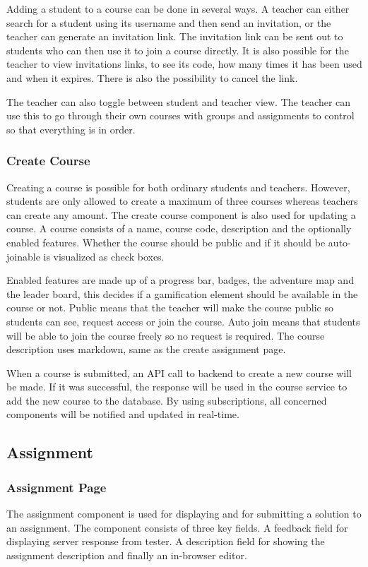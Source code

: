Adding a student to a course can be done in several ways. A teacher can either search for a student using its username and then send an invitation, or the teacher can generate an invitation link. The invitation link can be sent out to students who can then use it to join a course directly. It is also possible for the teacher to view invitations links, to see its code, how many times it has been used and when it expires. There is also the possibility to cancel the link.

The teacher can also toggle between student and teacher view. The teacher can use this to go through their own courses with groups and assignments to control so that everything is in order. 

\subsubsection{Create Course}
Creating a course is possible for both ordinary students and teachers. However, students are only allowed to create a maximum of three courses whereas teachers can create any amount. The create course component is also used for updating a course. A course consists of a name, course code, description and the optionally enabled features. Whether the course should be public and if it should be auto-joinable is visualized as check boxes.

Enabled features are made up of a progress bar, badges, the adventure map and the leader board, this decides if a gamification element should be available in the course or not. Public means that the teacher will make the course public so students can see, request access or join the course. Auto join means that students will be able to join the course freely so no request is required. The course description uses markdown, same as the create assignment page. 

When a course is submitted, an API call to backend to create a new course will be made. If it was successful, the response will be used in the course service to add the new course to the database. By using subscriptions, all concerned components will be notified and updated in real-time.

\subsection{Assignment}
\subsubsection{Assignment Page}
The assignment component is used for displaying and for submitting a solution to an assignment. The component consists of three key fields. A feedback field for displaying server response from tester. A description field for showing the assignment description and finally an in-browser editor. 

